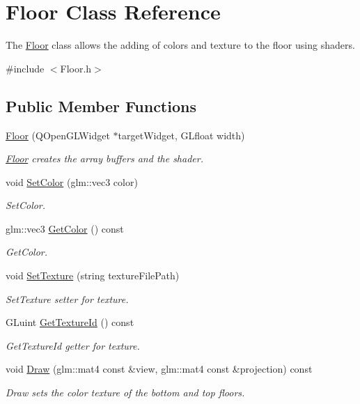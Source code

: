 \hypertarget{class_floor}{}\section{Floor Class Reference}
\label{class_floor}


The \hyperlink{class_floor}{Floor} class allows the adding of colors and texture to the floor using shaders.  




{\ttfamily \#include $<$Floor.\+h$>$}

\subsection*{Public Member Functions}
\begin{DoxyCompactItemize}
\item 
\hyperlink{class_floor_acd7d3bf0e838d5de06e973ac6310511b}{Floor} (Q\+Open\+G\+L\+Widget $\ast$target\+Widget, G\+Lfloat width)
\begin{DoxyCompactList}\small\item\em \hyperlink{class_floor}{Floor} creates the array buffers and the shader. \end{DoxyCompactList}\item 
void \hyperlink{class_floor_a6d0e6150ba611e218d81af542c8e0196}{Set\+Color} (glm\+::vec3 color)
\begin{DoxyCompactList}\small\item\em Set\+Color. \end{DoxyCompactList}\item 
glm\+::vec3 \hyperlink{class_floor_ad6022b618376adbf7087d5ccd3ea053d}{Get\+Color} () const 
\begin{DoxyCompactList}\small\item\em Get\+Color. \end{DoxyCompactList}\item 
void \hyperlink{class_floor_a61a025433294398423351ecc560e467b}{Set\+Texture} (string texture\+File\+Path)
\begin{DoxyCompactList}\small\item\em Set\+Texture setter for texture. \end{DoxyCompactList}\item 
G\+Luint \hyperlink{class_floor_ad1329cec2ad3a43d9418c6d4b98fe285}{Get\+Texture\+Id} () const 
\begin{DoxyCompactList}\small\item\em Get\+Texture\+Id getter for texture. \end{DoxyCompactList}\item 
void \hyperlink{class_floor_ac511f90a6e822dda5c9e3f2d40c5638f}{Draw} (glm\+::mat4 const \&view, glm\+::mat4 const \&projection) const 
\begin{DoxyCompactList}\small\item\em Draw sets the color texture of the bottom and top floors. \end{DoxyCompactList}\end{DoxyCompactItemize}


